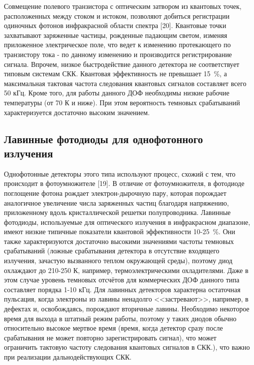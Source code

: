 Совмещение полевого транзистора с оптическим затвором из квантовых точек, расположенных между стоком и истоком, позволяют добиться регистрации одиночных фотонов инфракрасной области спектра [20]. Квантовые точки захватывают заряженные частицы, рожденные падающим светом, изменяя приложенное электрическое поле, что ведет к изменению протекающего по транзистору тока - по данному изменению и производится регистрирование сигнала. Впрочем, низкое быстродействие данного детектора не соответствует типовым системам СКК. Квантовая эффективность не превышает 15~\%, а максимальная тактовая частота следования квантовых сигналов составляет всего 50 кГц. Кроме того, для работы данного ДОФ необходимы низкие рабочие температуры (от 70 К и ниже). При этом вероятность темновых срабатываний характеризуется достаточно высоким значением.

\subsection{Лавинные фотодиоды для однофотонного излучения} \label{subsec:ch1/sec5/sub3}

Однофотонные детекторы этого типа используют процесс, схожий с тем, что происходит в фотоумножителе [19]. В отличие от фотоумножителя, в фотодиоде поглощение фотона рождает электрон-дырочную пару, которая порождает аналогичное увеличение числа заряженных частиц благодаря напряжению, приложенному вдоль кристаллической решетки полупроводника. Лавинные фотодиоды, используемые для оптического излучения в инфракрасном диапазоне, имеют низкие типичные показатели квантовой эффективности 10-25~\%. Они также характеризуются достаточно высокими значениями частоты темновых срабатываний (ложные срабатывания детектора в отсутствие входящего излучения, зачастую вызванного теплом окружающей среды), поэтому диод охлаждают до 210-250 К, например, термоэлектрическими охладителями. Даже в этом случае уровень темновых отсчётов для коммерческих ДОФ данного типа составляет порядка 1-10 кГц. Для лавинных детекторов характерна остаточная пульсация, когда электроны из лавины ненадолго <<застревают>>, например, в дефектах и, освобождаясь, порождают вторичные лавины. Необходимо некоторое время для выхода в штатный режим работы, поэтому у таких диодов обычно относительно высокое мертвое время (время, когда детектор сразу после срабатывания не может повторно зарегистрировать сигнал), что может ограничить тактовую частоту следования квантовых сигналов в СКК.), что важно при реализации дальнодействующих СКК.

